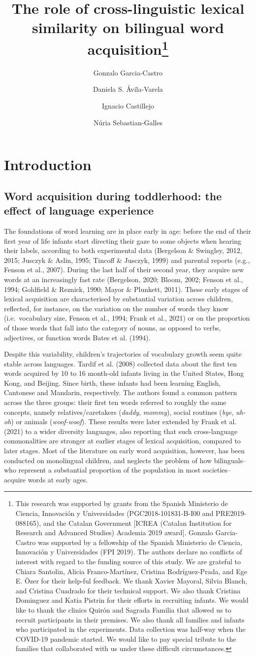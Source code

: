 \documentclass[
  letterpaper,
  DIV=11,
  numbers=noendperiod]{scrartcl}
\title{The role of cross-linguistic lexical similarity on bilingual word
acquisition\thanks{This research was supported by grants from the
Spanish Ministerio de Ciencia, Innovación y Universidades
(PGC2018-101831-B-I00 and PRE2019-088165), and the Catalan Government
{[}ICREA (Catalan Institution for Research and Advanced Studies)
Academia 2019 award{]}. Gonzalo Garcia-Castro was supported by a
fellowship of the Spanish Ministerio de Ciencia, Innovación y
Universidades (FPI 2019). The authors declare no conflicts of interest
with regard to the funding source of this study. We are grateful to
Chiara Santolin, Alicia Franco-Martínez, Cristina Rodríguez-Prada, and
Ege E. Özer for their help-ful feedback. We thank Xavier Mayoral, Silvia
Blanch, and Cristina Cuadrado for their technical support. We also thank
Cristina Dominguez and Katia Pistrin for their efforts in recruiting
infants. We would like to thank the clinics Quirón and Sagrada Familia
that allowed us to recruit participants in their premises. We also thank
all families and infants who participated in the experiments. Data
collection was half-way when the COVID-19 pandemic started. We would
like to pay special tribute to the families that collaborated with us
under these difficult circumstances.}}
\author{Gonzalo Garcia-Castro \and Daniela S. Ávila-Varela \and Ignacio
Castillejo \and Núria Sebastian-Galles}
\date{}
\begin{document}
\maketitle
\ifdefined\Shaded\renewenvironment{Shaded}{\begin{tcolorbox}[interior hidden, boxrule=0pt, borderline west={3pt}{0pt}{shadecolor}, breakable, enhanced, sharp corners, frame hidden]}{\end{tcolorbox}}\fi

\hypertarget{sec-introduction}{%
\section{Introduction}\label{sec-introduction}}

\hypertarget{word-acquisition-during-toddlerhood-the-effect-of-language-experience}{%
\subsection{Word acquisition during toddlerhood: the effect of language
experience}\label{word-acquisition-during-toddlerhood-the-effect-of-language-experience}}

The foundations of word learning are in place early in age: before the
end of their first year of life infants start directing their gaze to
some objects when hearing their labels, according to both experimental
data (Bergelson \& Swingley, 2012, 2015; Jusczyk \& Aslin, 1995; Tincoff
\& Jusczyk, 1999) and parental reports (e.g., Fenson et al., 2007).
During the last half of their second year, they acquire new words at an
increasingly fast rate (Bergelson, 2020; Bloom, 2002; Fenson et al.,
1994; Goldfield \& Reznick, 1990; Mayor \& Plunkett, 2011). These early
stages of lexical acquisition are characterised by substantial variation
across children, reflected, for instance, on the variation on the number
of words they know (i.e.~vocabulary size, Fenson et al., 1994; Frank et
al., 2021) or on the proportion of those words that fall into the
category of nouns, as opposed to verbs, adjectives, or function words
Bates et al. (1994).

Despite this variability, children's trajectories of vocabulary growth
seem quite stable across languages. Tardif et al. (2008) collected data
about the first ten words acquired by 10 to 16 month-old infants living
in the United States, Hong Kong, and Beijing. Since birth, these infants
had been learning English, Cantonese and Mandarin, respectively. The
authors found a common pattern across the three groups: their first ten
words referred to roughly the same concepts, namely relatives/caretakers
(\emph{daddy}, \emph{mommy}), social routines (\emph{bye}, \emph{uh-oh})
or animals (\emph{woof-woof}). These results were later extended by
Frank et al. (2021) to a wider diversity languages, also reporting that
such cross-language commonalities are stronger at earlier stages of
lexical acquisition, compared to later stages. Most of the literature on
early word acquisition, however, has been conducted on monolingual
children, and neglects the problem of how bilinguals--who represent a
substantial proportion of the population in most societies--acquire
words at early ages.
\end{document}

